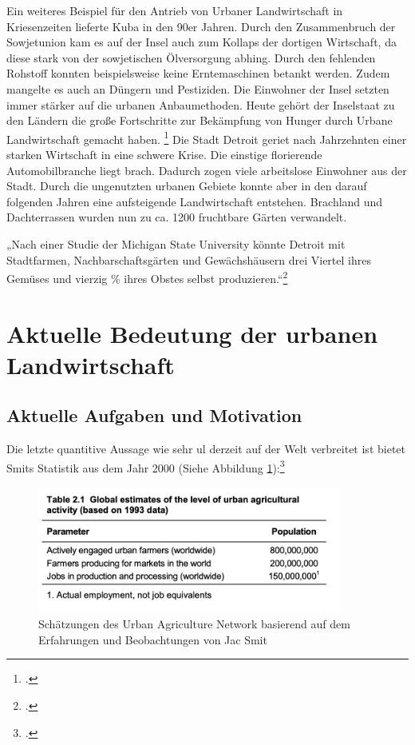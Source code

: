 \documentclass{scrartcl}
\begin{document}
Ein weiteres Beispiel für den Antrieb von Urbaner Landwirtschaft in Kriesenzeiten lieferte Kuba in den 90er Jahren. Durch den Zusammenbruch der Sowjetunion kam es auf der Insel auch zum Kollaps der dortigen Wirtschaft, da diese stark von der sowjetischen Ölversorgung abhing. Durch den fehlenden Rohstoff konnten beispielsweise keine Erntemaschinen betankt werden. Zudem mangelte es auch an Düngern und Pestiziden. Die Einwohner der Insel setzten immer stärker auf die urbanen Anbaumethoden. Heute gehört der Inselstaat zu den Ländern die große Fortschritte zur Bekämpfung von Hunger durch Urbane Landwirtschaft gemacht haben. \footcite[Vgl.]{Sieg2016DieKuba} Die Stadt Detroit geriet nach Jahrzehnten einer starken Wirtschaft in eine schwere Krise. Die einstige florierende Automobilbranche liegt brach. Dadurch zogen viele arbeitslose Einwohner aus der Stadt. Durch die ungenutzten urbanen Gebiete konnte aber in den darauf folgenden Jahren eine aufsteigende Landwirtschaft entstehen. Brachland und Dachterrassen wurden nun zu ca. 1200 fruchtbare Gärten verwandelt.

\begin{displayquote}
„Nach einer Studie der Michigan State University könnte Detroit mit Stadtfarmen, Nachbarschaftsgärten und Gewächshäusern drei Viertel ihres Gemüses und vierzig \% ihres Obstes selbst produzieren.“\footcite{Sieg2016GemuseDetroit}
\end{displayquote}

\section{Aktuelle Bedeutung der urbanen Landwirtschaft}
\subsection{Aktuelle Aufgaben und Motivation}

Die letzte quantitive Aussage wie sehr \acs{ul} derzeit auf der Welt verbreitet ist bietet Smits Statistik aus dem Jahr 2000 (Siehe Abbildung \ref{fig:ulstatistics}):\footcite[Vgl.][S.1]{Smit2001UrbanToday}
\begin{figure}[htbp]
    \centering
    \includegraphics[width=10cm]{image_folder/800000ul.png}
  \caption{Schätzungen des Urban Agriculture Network basierend auf dem Erfahrungen und Beobachtungen von Jac Smit}
  \label{fig:ulstatistics}
\end{figure} 
\end{document}
